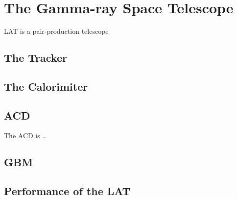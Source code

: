\section{The \fermi Gamma-ray Space Telescope}


\Ac{LAT} is a pair-production telescope

\subsection{The Tracker}
\subsection{The Calorimiter}
\subsection{\Acl{ACD}}

The \Ac{ACD} is \ldots

\subsection{\Acl{GBM}}


\subsection{Performance of the \acs{LAT}}
